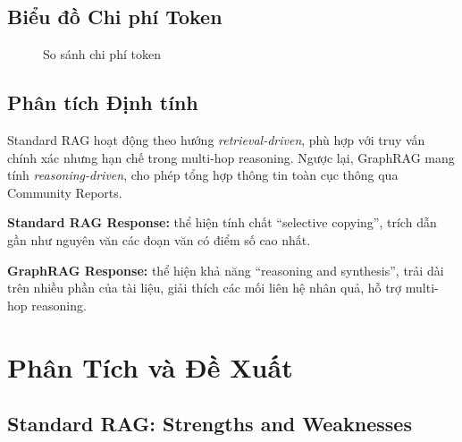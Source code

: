 \documentclass[10pt, conference, a4paper]{IEEEtran}
\begin{document}
\subsection{Biểu đồ Chi phí Token}

\begin{figure}[h]
\centering
{}
\caption{So sánh chi phí token}
\label{fig:tokens}
\end{figure}

\subsection{Phân tích Định tính}

Standard RAG hoạt động theo hướng \textit{retrieval-driven}, phù hợp
với truy vấn chính xác nhưng hạn chế trong multi-hop reasoning. Ngược
lại, GraphRAG mang tính \textit{reasoning-driven}, cho phép tổng hợp
thông tin toàn cục thông qua Community Reports.

\textbf{Standard RAG Response:} thể hiện tính chất ``selective copying'',
trích dẫn gần như nguyên văn các đoạn văn có điểm số cao nhất.

\textbf{GraphRAG Response:} thể hiện khả năng ``reasoning and synthesis'',
trải dài trên nhiều phần của tài liệu, giải thích các mối liên hệ nhân quả,
hỗ trợ multi-hop reasoning.

\section{Phân Tích và Đề Xuất}

\subsection{Standard RAG: Strengths and Weaknesses}
\end{document}
